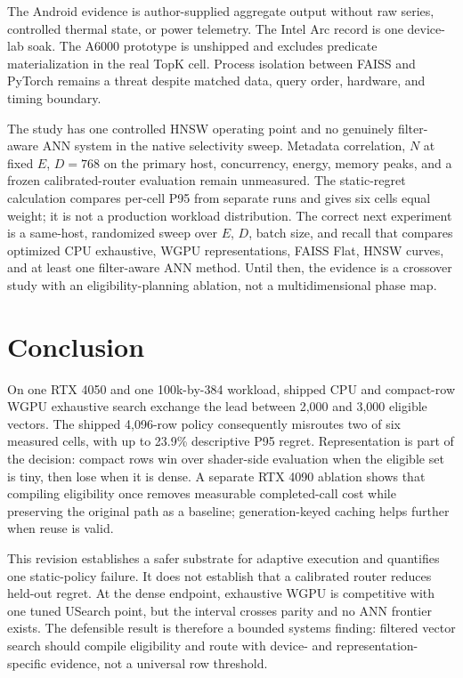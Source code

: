 \documentclass[10pt]{article}
\newcommand{\E}{E}
\newcommand{\D}{D}
\begin{document}
The Android evidence is author-supplied aggregate output without raw series, controlled thermal state, or power telemetry. The Intel Arc record is one device-lab soak. The A6000 prototype is unshipped and excludes predicate materialization in the real TopK cell. Process isolation between FAISS and PyTorch remains a threat despite matched data, query order, hardware, and timing boundary.

The study has one controlled HNSW operating point and no genuinely filter-aware ANN system in the native selectivity sweep. Metadata correlation, \(N\) at fixed \(\E\), \(\D=768\) on the primary host, concurrency, energy, memory peaks, and a frozen calibrated-router evaluation remain unmeasured. The static-regret calculation compares per-cell P95 from separate runs and gives six cells equal weight; it is not a production workload distribution. The correct next experiment is a same-host, randomized sweep over \(\E\), \(\D\), batch size, and recall that compares optimized CPU exhaustive, WGPU representations, FAISS Flat, HNSW curves, and at least one filter-aware ANN method. Until then, the evidence is a crossover study with an eligibility-planning ablation, not a multidimensional phase map.

\section{Conclusion}
On one RTX 4050 and one 100k-by-384 workload, shipped CPU and compact-row WGPU exhaustive search exchange the lead between 2,000 and 3,000 eligible vectors. The shipped 4,096-row policy consequently misroutes two of six measured cells, with up to 23.9\% descriptive P95 regret. Representation is part of the decision: compact rows win over shader-side evaluation when the eligible set is tiny, then lose when it is dense. A separate RTX 4090 ablation shows that compiling eligibility once removes measurable completed-call cost while preserving the original path as a baseline; generation-keyed caching helps further when reuse is valid.

This revision establishes a safer substrate for adaptive execution and quantifies one static-policy failure. It does not establish that a calibrated router reduces held-out regret. At the dense endpoint, exhaustive WGPU is competitive with one tuned USearch point, but the interval crosses parity and no ANN frontier exists. The defensible result is therefore a bounded systems finding: filtered vector search should compile eligibility and route with device- and representation-specific evidence, not a universal row threshold.
\end{document}

